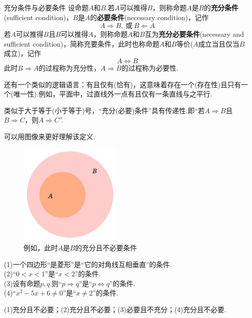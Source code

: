 \documentclass[lang=cn, zihao=5]{elegantbook}
\newcommand{\tk}{\uline{\hspace{4em}}}
\begin{document}
\begin{definition}{充分条件与必要条件} %
	设命题$A$和$B$.若$A$可以推得$B$，则称命题$A$是$B$的\textbf{充分条件}(sufficient condition)，$B$是$A$的\textbf{必要条件}(necessary condition)，记作$$A \Rightarrow B,~\text{或}~B \Leftarrow A$$
	若$A$可以推得$B$且$B$可以推得$A$，则称命题$A$和$B$互为\textbf{充分必要条件}(necessary and sufficient condition)，简称充要条件，此时也称命题$A$和$B$等价($A$成立当且仅当$B$成立)，记作$$A \Leftrightarrow B$$
	此时$B \Rightarrow A$的过程称为充分性，$A \Rightarrow B$的过程称为必要性.
\end{definition}
\begin{remark}
	还有一个类似的逻辑语言：有且仅有(恰有)，这意味着存在一个(存在性)且只有一个(唯一性).例如，平面中，过直线外一点有且仅有一条直线与之平行.
\end{remark}
\begin{remark}
	类似于大于等于(小于等于)号，“充分(必要)条件”具有传递性.即“若$A \Rightarrow B$且$B \Rightarrow C$，则$A \Rightarrow C$”.
\end{remark}

可以用图像来更好理解该定义.

\begin{figure}[h!]
	\centering
	\includegraphics[width=5cm]{attachment/202302191.pdf}
	\caption{例如，此时$A$是$B$的充分且不必要条件}
\end{figure}

\begin{example}
	(1)一个四边形“是菱形”是“它的对角线互相垂直”的\tk 条件. \\
	(2)“$0<x<1$”是“$x<2$”的\tk 条件. \\
	(3)设有命题$p,q$.则“$p \Rightarrow q$”是“$p \Leftrightarrow q$”的\tk 条件. \\
	(4)“$x^2-5x+6 \neq 0$”是“$x \neq 2$”的\tk 条件.
\end{example}
\begin{solution}
	(1)充分且不必要；(2)充分且不必要；(3)必要且不充分；(4)充分且不必要.
\end{solution}
\end{document}
